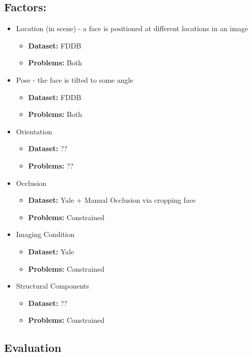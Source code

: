 \documentclass[11pt, twocolumn]{article} %
\theoremstyle{plain}
\theoremstyle{definition}
\theoremstyle{remark}
\numberwithin{equation}{section} %
\numberwithin{figure}{section} %
\numberwithin{table}{section} %
\begin{document}
\subsection{Factors:}
\begin{itemize}
  \item Location (in scene) - a face is positioned at different locations in an image
  \begin{itemize}
    \item \textbf{Dataset:} FDDB
    \item \textbf{Problems:} Both 
  \end{itemize}
  \item Pose - the face is tilted to some angle
  \begin{itemize}
    \item \textbf{Dataset:} FDDB
    \item \textbf{Problems:} Both 
  \end{itemize}
    \item Orientation
  \begin{itemize}
    \item \textbf{Dataset:} ??
    \item \textbf{Problems:} ??
  \end{itemize}
  \item Occlusion
  \begin{itemize}
    \item \textbf{Dataset:} Yale + Manual Occlusion via cropping face
    \item \textbf{Problems:} Constrained 
  \end{itemize}
  \item Imaging Condition
  \begin{itemize}
    \item \textbf{Dataset:} Yale
    \item \textbf{Problems:} Constrained
  \end{itemize}
  \item Structural Components

  \begin{itemize}
    \item \textbf{Dataset:} ??
    \item \textbf{Problems:} Constrained
  \end{itemize}
\end{itemize}

\subsection{Evaluation}
\end{document}
